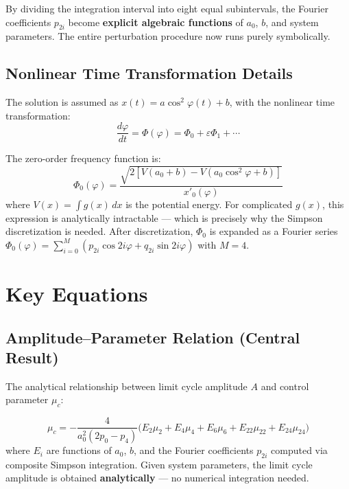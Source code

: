 \documentclass[11pt,a4paper]{article}
\begin{document}
By dividing the integration interval into eight equal subintervals, the Fourier coefficients $p_{2i}$ become \textbf{explicit algebraic functions} of $a_0$, $b$, and system parameters. The entire perturbation procedure now runs purely symbolically.

\subsection{Nonlinear Time Transformation Details}

The solution is assumed as $x(t) = a\cos^2\varphi(t) + b$, with the nonlinear time transformation:
\begin{equation}
\frac{d\varphi}{dt} = \Phi(\varphi) = \Phi_0 + \varepsilon\Phi_1 + \cdots
\end{equation}

The zero-order frequency function is:
\begin{equation}
\Phi_0(\varphi) = \frac{\sqrt{2[V(a_0+b) - V(a_0\cos^2\varphi + b)]}}{x'_0(\varphi)}
\end{equation}
where $V(x) = \int g(x)\,dx$ is the potential energy. For complicated $g(x)$, this expression is analytically intractable --- which is precisely why the Simpson discretization is needed. After discretization, $\Phi_0$ is expanded as a Fourier series $\Phi_0(\varphi) = \sum_{i=0}^{M} (p_{2i}\cos 2i\varphi + q_{2i}\sin 2i\varphi)$ with $M=4$.

\section{Key Equations}

\subsection{Amplitude--Parameter Relation (Central Result)}

The analytical relationship between limit cycle amplitude $A$ and control parameter $\mu_c$:

\begin{equation}
\boxed{\mu_c = -\frac{4}{a_0^2(2p_0 - p_4)}\Big(E_2\mu_2 + E_4\mu_4 + E_6\mu_6 + E_{22}\mu_{22} + E_{24}\mu_{24}\Big)}
\label{eq:amplitude}
\end{equation}
where $E_i$ are functions of $a_0$, $b$, and the Fourier coefficients $p_{2i}$ computed via composite Simpson integration. Given system parameters, the limit cycle amplitude is obtained \textbf{analytically} --- no numerical integration needed.
\end{document}
